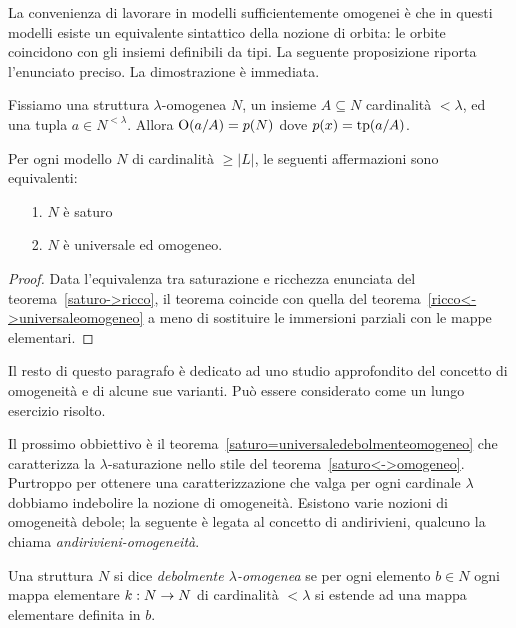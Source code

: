 La convenienza di lavorare in modelli sufficientemente omogenei \`e che in questi modelli esiste un equivalente sintattico della nozione di orbita: le orbite coincidono con gli insiemi definibili da tipi. La seguente proposizione riporta l'enunciato preciso. La dimostrazione \`e immediata.



\begin{proposition}\label{omogeneitaorbitetipi}
Fissiamo una struttura $\lambda$-omogenea $N$, un insieme $A\subseteq N$ cardinalit\`a $<\lambda$, ed una tupla $a\in N^{<\lambda}$. Allora $\textrm{O}(a/A)=p(N)$ dove $p(x)=\textrm{tp}(a/A)$.\QED
\end{proposition}


\begin{theorem}\label{saturo<->omogeneo}
Per ogni modello $N$ di cardinalit\`a $\ge|L|$, le seguenti affermazioni sono equivalenti:\nobreak
\begin{itemize}
\item[1.] $N$ \`e saturo
\item[2.] $N$ \`e universale ed omogeneo.
\end{itemize}
\end{theorem}

\begin{proof}
Data l'equivalenza tra saturazione e ricchezza enunciata del teorema~\ref{saturo->ricco}, il teorema coincide con quella del teorema~\ref{ricco<->universaleomogeneo} a meno di sostituire le immersioni parziali con le mappe elementari.
\end{proof}


Il resto di questo paragrafo \`e dedicato ad uno studio approfondito del concetto di omogeneit\`a e di alcune sue varianti. Pu\`o essere considerato come un lungo esercizio risolto.

Il prossimo obbiettivo \`e il teorema~\ref{saturo=universaledebolmenteomogeneo} che caratterizza la $\lambda$-saturazione nello stile del teorema~\ref{saturo<->omogeneo}. Purtroppo per ottenere una caratterizzazione che valga per ogni cardinale $\lambda$ dobbiamo indebolire la nozione di omogeneit\`a. Esistono varie nozioni di omogeneit\`a debole; la seguente \`e legata al concetto di andirivieni, qualcuno la chiama \textit{andirivieni-omogeneit\`a}.

\begin{definition}
Una struttura $N$ si dice \emph{debolmente $\lambda$-omogenea\/} se per ogni elemento $b\in N$ ogni mappa elementare $k:N\rightarrow N$ di cardinalit\`a $<\lambda$ si estende ad una mappa elementare definita in $b$.
\end{definition}

